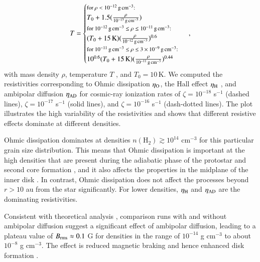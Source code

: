 \documentclass{aa}
\newcommand{\unit}[1]{\ensuremath{\, \mathrm{#1}}}
\begin{document}
\begin{equation}
  T =
    \begin{cases}
      \footnotesize{\text{for $\rho < 10^{-12}\unit{g}\unit{cm}^{-3}$:} }   \\
      T_0 + 1.5 (\frac{\rho}{10^{-13}\unit{g}\unit{cm}^{-3}}) \\
      \footnotesize{\text{for $10^{-12} \unit{g}\unit{cm}^{-3} \leq \rho \leq 10^{-11} \unit{g}\unit{cm}^{-3}$: } } \\
      (T_0+15 \unit{K}) (\frac{\rho}{10^{-12}\unit{g}\unit{cm}^{-3}})^{0.6} \\
      \footnotesize{\text{for $10^{-11} \unit{g}\unit{cm}^{-3} \leq \rho \leq 3\times 10^{-9} \unit{g}\unit{cm}^{-3}$: } } \\
      10^{0.6} (T_0 + 15 \unit{K}) (\frac{\rho}{10^{-11}\unit{g}\unit{cm}^{-3}})^{0.44} 
    \end{cases}       
,\end{equation}
with mass density $\rho$, temperature $T$ , and $T_0 = 10 \unit{K}$.
We computed the resistivities corresponding to Ohmic dissipation $\eta_{\rm O}$, the Hall effect $\eta_{\rm H}$ , and ambipolar diffusion $\eta_{\rm AD}$ for cosmic-ray ionization rates of $\zeta = 10^{-18}$ s$^{-1}$ (dashed lines), $\zeta = 10^{-17}$ s$^{-1}$ (solid lines), and $\zeta = 10^{-16}$ s$^{-1}$ (dash-dotted lines).
The plot illustrates the high variability of the resistivities and shows that different resistive effects dominate at different densities.

 Ohmic dissipation dominates at densities $n(\mathrm{H}_2) \gtrsim 10^{14}$ cm$^{-3}$ for this particular grain size distribution.
This means that Ohmic dissipation is important at the high densities that are present during the adiabatic phase of the protostar and second core formation \citep[e.g.,][]{Tomida2015,Vaytet2018},
and it also affects the properties in the midplane of the inner disk \citep[e.g.,][]{Gressel2015,Bai2016}.   
In contrast, Ohmic dissipation does not affect the processes beyond $r>10$ au from the star significantly.
For lower densities, $\eta_{\rm H}$ and $\eta_{\rm AD}$ are the dominating resistivities. 

Consistent with theoretical analysis \citep{Hennebelle2016}, comparison runs with and without 
ambipolar diffusion suggest a significant effect of ambipolar diffusion, leading to a plateau value of $B_{\rm rms}\approx 0.1$ G for densities in the range of
$10^{-14}$ g cm$^{-3}$ to about $10^{-8}$ g cm$^{-3}$. The effect is reduced magnetic braking 
and hence enhanced disk formation \citep[see the core collapse simulation by][]{Masson2016}.
\end{document}

